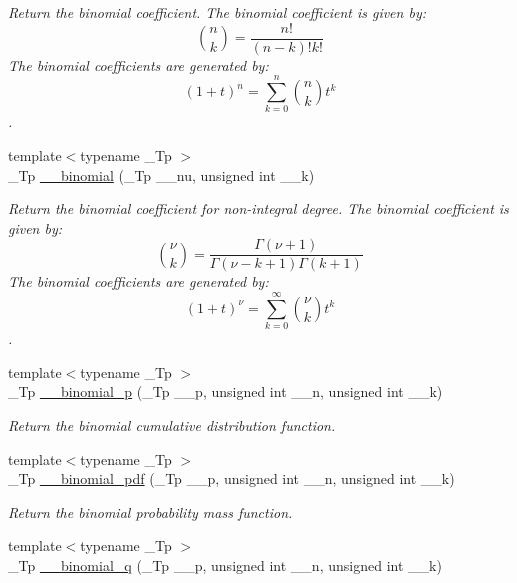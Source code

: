 \begin{DoxyCompactItemize}
\begin{DoxyCompactList}\small\item\em Return the binomial coefficient. The binomial coefficient is given by\+: \[ \binom{n}{k} = \frac{n!}{(n-k)! k!} \] The binomial coefficients are generated by\+: \[ \left(1 + t\right)^n = \sum_{k=0}^n \binom{n}{k} t^k \]. \end{DoxyCompactList}\item 
{\footnotesize template$<$typename \+\_\+\+Tp $>$ }\\\+\_\+\+Tp \hyperlink{namespacestd_1_1____detail_a9ac7d44eebfe3e1a3fb5ebbd9c08bd55}{\+\_\+\+\_\+binomial} (\+\_\+\+Tp \+\_\+\+\_\+nu, unsigned int \+\_\+\+\_\+k)
\begin{DoxyCompactList}\small\item\em Return the binomial coefficient for non-\/integral degree. The binomial coefficient is given by\+: \[ \binom{\nu}{k} = \frac{\Gamma(\nu+1)}{\Gamma(\nu-k+1) \Gamma(k+1)} \] The binomial coefficients are generated by\+: \[ \left(1 + t\right)^\nu = \sum_{k=0}^\infty \binom{\nu}{k} t^k \]. \end{DoxyCompactList}\item 
{\footnotesize template$<$typename \+\_\+\+Tp $>$ }\\\+\_\+\+Tp \hyperlink{namespacestd_1_1____detail_a6efd57f8f3b9ea42df29de116db6081b}{\+\_\+\+\_\+binomial\+\_\+p} (\+\_\+\+Tp \+\_\+\+\_\+p, unsigned int \+\_\+\+\_\+n, unsigned int \+\_\+\+\_\+k)
\begin{DoxyCompactList}\small\item\em Return the binomial cumulative distribution function. \end{DoxyCompactList}\item 
{\footnotesize template$<$typename \+\_\+\+Tp $>$ }\\\+\_\+\+Tp \hyperlink{namespacestd_1_1____detail_acaeb596397431731cba684ca1f04cbfc}{\+\_\+\+\_\+binomial\+\_\+pdf} (\+\_\+\+Tp \+\_\+\+\_\+p, unsigned int \+\_\+\+\_\+n, unsigned int \+\_\+\+\_\+k)
\begin{DoxyCompactList}\small\item\em Return the binomial probability mass function. \end{DoxyCompactList}\item 
{\footnotesize template$<$typename \+\_\+\+Tp $>$ }\\\+\_\+\+Tp \hyperlink{namespacestd_1_1____detail_a710184fcff974a80bd9ba5862081042b}{\+\_\+\+\_\+binomial\+\_\+q} (\+\_\+\+Tp \+\_\+\+\_\+p, unsigned int \+\_\+\+\_\+n, unsigned int \+\_\+\+\_\+k)

\end{DoxyCompactItemize}
